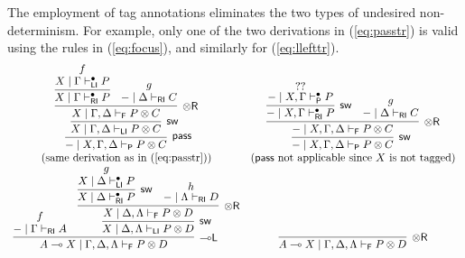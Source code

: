 \documentclass[copyright,creativecommons]{eptcs}
\theoremstyle{definition}
\newcommand{\tr}{\otimes \mathsf{R}}
\newcommand{\lleft}{{\multimap}\mathsf{L}}
\newcommand{\pass}{\mathsf{pass}}
\newcommand{\ot}{\otimes}
\newcommand{\lolli}{\multimap}
\newcommand{\RI}{\mathsf{RI}}
\newcommand{\LI}{\mathsf{LI}}
\newcommand{\Pass}{\mathsf{P}}
\newcommand{\F}{\mathsf{F}}
\begin{document}
The employment of tag annotations eliminates the two types of undesired non-determinism. For example, only one of the two derivations in (\ref{eq:passtr}) is valid using the rules in (\ref{eq:focus}), and similarly for (\ref{eq:llefttr}).
\vspace{-.3cm}
\begin{displaymath}
  \begin{array}{cc}
      \infer[\pass]{{-} \mid X , \Gamma , \Delta \vdash_{\Pass} P \ot C}{
        \infer[\mathsf{sw}]{X \mid \Gamma , \Delta \vdash_{\LI} P \ot C}{
          \infer[\tr]{X \mid \Gamma , \Delta \vdash_{\F} P \ot C}{
            \infer{X \mid \Gamma \vdash^{\bullet}_{\RI} P}{
              \deduce{X \mid \Gamma \vdash^{\bullet}_{\LI} P}{f}
              }
            &
            \deduce{{-} \mid \Delta \vdash_{\RI} C}{g}
          }
        }
      }
    &
    \infer[\mathsf{sw}]{{-} \mid X , \Gamma , \Delta \vdash_{\Pass} P \ot C}{
      \infer[\tr]{{-} \mid X , \Gamma , \Delta \vdash_{\F} P \ot C}{
        \infer[\mathsf{sw}]{{-} \mid X , \Gamma \vdash^{\bullet}_{\RI} P}{
          \deduce{{-} \mid X , \Gamma \vdash^{\bullet}_{\Pass} P}{??}
        }
        &
        \deduce{{-} \mid \Delta \vdash_{\RI} C}{g}
      }
    }
    \\
    (\text{same derivation as in (\ref{eq:passtr})})
    &
    (\text{$\pass$ not applicable since $X$ is not tagged})
    \\[2pt]
      \infer[\lleft]{A \lolli X \mid \Gamma , \Delta , \Lambda \vdash_{\F} P \ot D}{
        \deduce{{-} \mid \Gamma \vdash_{\RI} A}{f}
        &
        \infer[\mathsf{sw}]{X \mid \Delta , \Lambda \vdash_{\LI} P \ot D}{
          \infer[\tr]{X \mid \Delta , \Lambda \vdash_{\F} P \ot D}{
            \infer[\mathsf{sw}]{X \mid \Delta \vdash^{\bullet}_{\RI} P}{
              \deduce{X \mid \Delta \vdash^{\bullet}_{\LI} P}{g}
              }
            &
            \deduce{{-} \mid \Lambda \vdash_{\RI} D}{h}
          }
        }
      }
    &
      \infer[\tr]{A \lolli X \mid \Gamma , \Delta , \Lambda \vdash_{\F} P \ot D}{
}
\end{array}
\end{displaymath}
\end{document}
